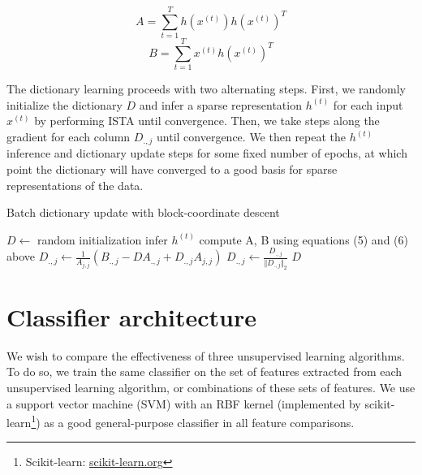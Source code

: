 \documentclass{article} %
\begin{document}
\begin{equation}
A = \sum_{t=1}^T h(x^{(t)}) h(x^{(t)})^T
\end{equation}
\begin{equation}
B = \sum_{t=1}^T x^{(t)} h(x^{(t)})^T
\end{equation}


The dictionary learning proceeds with two alternating steps. First, we randomly initialize the dictionary $D$ and infer a sparse representation $h^{(t)}$ for each input $x^{(t)}$ by performing ISTA until convergence. Then, we take steps along the gradient for each column $D_{.,j}$ until convergence. We then repeat the $h^{(t)}$ inference and dictionary update steps for some fixed number of epochs, at which point the dictionary will have converged to a good basis for sparse representations of the data.


\begin{algorithm}
\caption{Batch dictionary update with block-coordinate descent}
\begin{algorithmic}[1]
\State $D\gets$ random initialization
		\State infer $h^{(t)}$ 
	\EndFor
	\State compute A, B using equations (5) and (6) above
			\State $D_{.,j}\gets \frac{1}{A_{j,j}} (B_{.,j} - D A_{.,j} + D_{.,j} A_{j,j})$
			\State $D_{.,j}\gets \frac{D_{.,j}}{\Vert D_{.,j} \Vert_2}$ 
		\EndFor
	\EndWhile
\EndWhile
\State\Return $D$
\end{algorithmic}
\end{algorithm}

\section{Classifier architecture}
We wish to compare the effectiveness of three unsupervised learning algorithms. To do so, we train the same classifier on the set of features extracted from each unsupervised learning algorithm, or combinations of these sets of features. We use a support vector machine (SVM) with an RBF kernel (implemented by scikit-learn\footnote{Scikit-learn: \url{scikit-learn.org}}) as a good general-purpose classifier in all feature comparisons.
\end{document}
